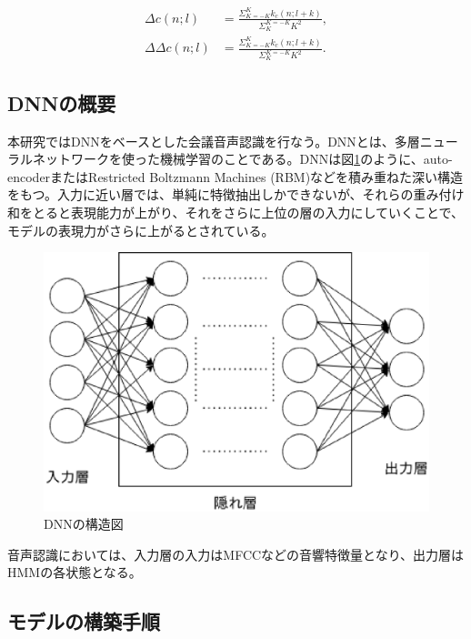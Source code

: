{{\begin{align}
\Delta c(n;l) &= \frac{\Sigma_{K=-K}^{K}k_c(n;l+k)}{\Sigma_{K}^{K=-K}K^2}, \label{eq:deltac} \\
\Delta\Delta c(n;l) &= \frac{\Sigma_{K=-K}^{K}k_c(n;l+k)}{\Sigma_{K}^{K=-K}K^2}. \label{eq:deltadeltac}
\end{align}

\subsection{DNNの概要\cite{audio_textbook}}
本研究ではDNNをベースとした会議音声認識を行なう。DNNとは、多層ニューラルネットワークを使った機械学習のことである。DNNは図\ref{fig:dnn}のように、auto-encoderまたはRestricted Boltzmann Machines (RBM)などを積み重ねた深い構造をもつ。入力に近い層では、単純に特徴抽出しかできないが、それらの重み付け和をとると表現能力が上がり、それをさらに上位の層の入力にしていくことで、モデルの表現力がさらに上がるとされている。\par

\begin{figure}[H]
  \begin{center}
    \includegraphics[scale=0.5]{./figure/structure_dnn.eps}
  \end{center}
  \caption{DNNの構造図}
  \label{fig:dnn}
\end{figure}

音声認識においては、入力層の入力はMFCCなどの音響特徴量となり、出力層はHMMの各状態となる。

\subsection{モデルの構築手順}}}\par
